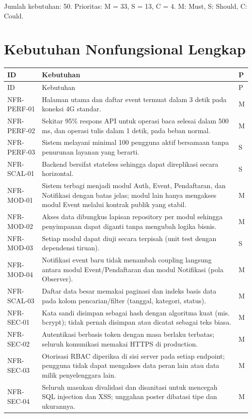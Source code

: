 \documentclass[11pt,a4paper]{article}
\newcommand{\page}[1]{\clearpage\section{#1}}
\begin{document}
Jumlah kebutuhan: 50. Prioritas: M = 33, S = 13, C = 4. M: Must, S: Should, C: Could.

\page{Kebutuhan Nonfungsional Lengkap}
\small\begin{longtable}{p{3cm}p{10.5cm}p{.5cm}}
\toprule ID & Kebutuhan & P\\\midrule\endfirsthead
\toprule ID & Kebutuhan & P\\\midrule\endhead\bottomrule\endfoot
NFR-PERF-01 & Halaman utama dan daftar event termuat dalam 3 detik pada koneksi 4G standar. & M\\
NFR-PERF-02 & Sekitar 95\% respons API untuk operasi baca selesai dalam 500 ms, dan operasi tulis dalam 1 detik, pada beban normal. & M\\
NFR-PERF-03 & Sistem melayani minimal 100 pengguna aktif bersamaan tanpa penurunan layanan yang berarti. & S\\
NFR-SCAL-01 & Backend bersifat stateless sehingga dapat direplikasi secara horizontal. & S\\
NFR-MOD-01 & Sistem terbagi menjadi modul Auth, Event, Pendaftaran, dan Notifikasi dengan batas jelas; modul lain hanya mengakses modul Event melalui kontrak publik yang stabil. & M\\
NFR-MOD-02 & Akses data dibungkus lapisan repository per modul sehingga penyimpanan dapat diganti tanpa mengubah logika bisnis. & M\\
NFR-MOD-03 & Setiap modul dapat diuji secara terpisah (unit test dengan dependensi tiruan). & S\\
NFR-MOD-04 & Notifikasi event baru tidak menambah coupling langsung antara modul Event/Pendaftaran dan modul Notifikasi (pola Observer). & M\\
NFR-SCAL-03 & Daftar data besar memakai paginasi dan indeks basis data pada kolom pencarian/filter (tanggal, kategori, status). & M\\
NFR-SEC-01 & Kata sandi disimpan sebagai hash dengan algoritma kuat (mis. bcrypt); tidak pernah disimpan atau dicatat sebagai teks biasa. & M\\
NFR-SEC-02 & Autentikasi berbasis token dengan masa berlaku terbatas; seluruh komunikasi memakai HTTPS di production. & M\\
NFR-SEC-03 & Otorisasi RBAC diperiksa di sisi server pada setiap endpoint; pengguna tidak dapat mengakses data peran lain atau data milik penyelenggara lain. & M\\
NFR-SEC-04 & Seluruh masukan divalidasi dan disanitasi untuk mencegah SQL injection dan XSS; unggahan poster dibatasi tipe dan ukurannya. & M\\

\end{longtable}
\end{document}
